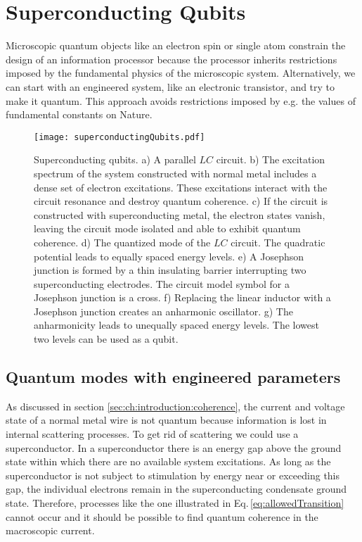 \section{Superconducting Qubits}

Microscopic quantum objects like an electron spin or single atom constrain the design of an information processor because the processor inherits restrictions imposed by the fundamental physics of the microscopic system. Alternatively, we can start with an engineered system, like an electronic transistor, and try to make it quantum. This approach avoids restrictions imposed by e.g. the values of fundamental constants on Nature.

\begin{figure}
\begin{centering}
\texttt{[image: superconductingQubits.pdf]}
\par\end{centering}
\caption{Superconducting qubits. a) A parallel $LC$ circuit.
b) The excitation spectrum of the system constructed with normal metal includes a dense set of electron excitations.
These excitations interact with the circuit resonance and destroy quantum coherence.
c) If the circuit is constructed with superconducting metal, the electron states vanish, leaving the circuit mode isolated and able to exhibit quantum coherence.
d) The quantized mode of the $LC$ circuit.
The quadratic potential leads to equally spaced energy levels.
e) A Josephson junction is formed by a thin insulating barrier interrupting two superconducting electrodes.
The circuit model symbol for a Josephson junction is a cross.
f) Replacing the linear inductor with a Josephson junction creates an anharmonic oscillator.
g) The anharmonicity leads to unequally spaced energy levels.
The lowest two levels can be used as a qubit.}
\label{Fig:superconductingQubits}
\end{figure}

\subsection{Quantum modes with engineered parameters}

As discussed in section \ref{sec:ch:introduction:coherence}, the current and voltage state of a normal metal wire is not quantum because information is lost in internal scattering processes. To get rid of scattering we could use a superconductor. In a superconductor there is an energy gap above the ground state within which there are no available system excitations. As long as the superconductor is not subject to stimulation by energy near or exceeding this gap, the individual electrons remain in the superconducting condensate ground state. Therefore, processes like the one illustrated in Eq.\,\ref{eq:allowedTransition} cannot occur and it should be possible to find quantum coherence in the macroscopic current.


